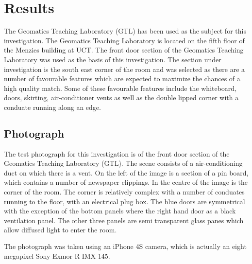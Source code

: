 \documentclass[11pt,a4paper]{report}
\begin{document}
\chapter{Results}
	The Geomatics Teaching Laboratory (GTL) has been used as the subject for this investigation. The Geomatics Teaching Laboratory is located on the fifth floor of the Menzies building at UCT. The front door section of the Geomatics Teaching Laboratory was used as the basis of this investigation. The section under investigation is the south east corner of the room and was selected as there are a number of favourable features which are expected to maximize the chances of a high quality match. Some of these favourable features include the whiteboard, doors, skirting, air-conditioner vents as well as the double lipped corner with a conduate running along an edge.
	
	\section{Photograph}
		The test photograph for this investigation is of the front door section of the Geomatics Teaching Laboratory (GTL). The scene consists of a air-conditioning duct on which there is a vent. On the left of the image is a section of a pin board, which contains a number of newspaper clippings. In the centre of the image is the corner of the room. The corner is relatively complex with a number of conduates running to the floor, with an electrical plug box. The blue doors are symmetrical with the exception of the bottom panels where the right hand door as a black ventilation panel. The other three panels are semi transparent glass panes which allow diffused light to enter the room.
		
		The photograph was taken using an iPhone 4S camera, which is actually an eight megapixel Sony Exmor R IMX 145.
		
\end{document}
